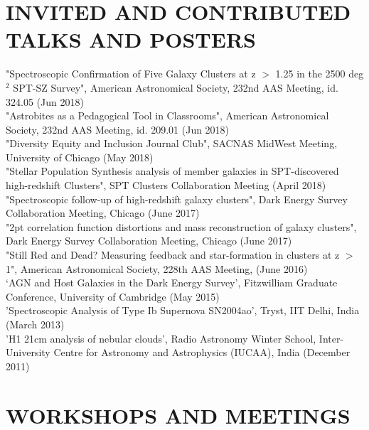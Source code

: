 \documentclass[margin]{res}
\begin{document}
\begin{resume}
\section{INVITED AND CONTRIBUTED TALKS AND POSTERS}
"Spectroscopic Confirmation of Five Galaxy Clusters at z $>$ 1.25 in the 2500 deg$^2$ SPT-SZ Survey", American Astronomical Society, 232nd AAS Meeting, id. 324.05 (Jun 2018)\\
"Astrobites as a Pedagogical Tool in Classrooms", American Astronomical Society, 232nd AAS Meeting, id. 209.01 (Jun 2018)\\
"Diversity Equity and Inclusion Journal Club", SACNAS MidWest Meeting, University of Chicago (May 2018)\\
"Stellar Population Synthesis analysis of member galaxies in SPT-discovered high-redshift Clusters", SPT Clusters Collaboration Meeting (April 2018)\\
"Spectroscopic follow-up of high-redshift galaxy clusters", Dark Energy Survey Collaboration Meeting, Chicago (June 2017)\\
"2pt correlation function distortions and mass reconstruction of galaxy clusters", Dark Energy Survey Collaboration Meeting, Chicago (June 2017)\\
"Still Red and Dead? Measuring feedback and star-formation in clusters at z $>$ 1", American Astronomical Society, 228th AAS Meeting, (June 2016)\\
`AGN and Host Galaxies in the Dark Energy Survey', Fitzwilliam Graduate Conference, University of Cambridge (May 2015)\\
'Spectroscopic Analysis of Type Ib Supernova SN2004ao', Tryst, IIT Delhi, India (March 2013)\\ 
'H1 21cm analysis of nebular clouds', Radio Astronomy Winter School, Inter-University Centre for Astronomy and Astrophysics (IUCAA), India (December 2011)\\

\section{WORKSHOPS AND MEETINGS}


\end{resume}
\end{document}
